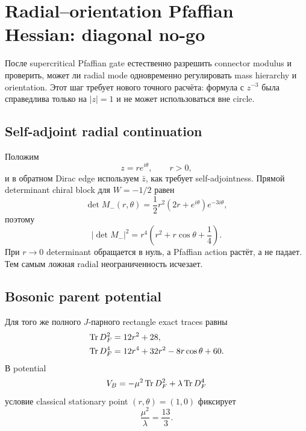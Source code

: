 \chapter{Radial--orientation Pfaffian Hessian: diagonal no-go}

После supercritical Pfaffian gate естественно разрешить connector modulus и
проверить, может ли radial mode одновременно регулировать mass hierarchy и
orientation. Этот шаг требует нового точного расчёта: формула с \(z^{-3}\)
была справедлива только на \(|z|=1\) и не может использоваться вне circle.

\section{Self-adjoint radial continuation}

Положим
\begin{equation}
 z=re^{i\theta},
 \qquad r>0,
\end{equation}
и в обратном Dirac edge используем \(\bar z\), как требует
self-adjointness. Прямой determinant chiral block для \(W=-1/2\) равен
\begin{equation}
 \det M_-(r,\theta)
 =\frac12r^2(2r+e^{i\theta})e^{-3i\theta},
\end{equation}
поэтому
\begin{equation}
 |\det M_-|^2
 =r^4\left(r^2+r\cos\theta+\frac14\right).
\end{equation}
При \(r\to0\) determinant обращается в нуль, а Pfaffian action растёт, а не
падает. Тем самым ложная radial неограниченность исчезает.

\section{Bosonic parent potential}

Для того же полного \(J\)-парного rectangle exact traces равны
\begin{align}
 \operatorname{Tr} D_F^2&=12r^2+28,\\
 \operatorname{Tr} D_F^4&=12r^4+32r^2-8r\cos\theta+60.
\end{align}
В potential
\begin{equation}
 V_B=-\mu^2\operatorname{Tr} D_F^2+\lambda\operatorname{Tr} D_F^4
\end{equation}
условие classical stationary point \((r,\theta)=(1,0)\) фиксирует
\begin{equation}
 \frac{\mu^2}{\lambda}=\frac{13}{3}.
\end{equation}

